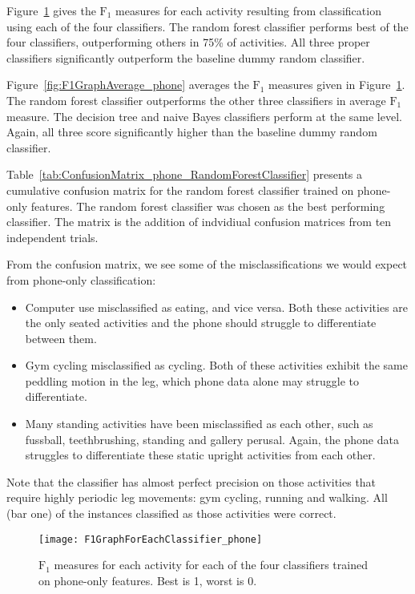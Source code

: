     Figure~\ref{fig:F1GraphForEachClassifier_phone} gives the $\mathrm{F}_1$ measures for each activity resulting from classification using each of the four classifiers. The random forest classifier performs best of the four classifiers, outperforming others in 75\% of activities. All three proper classifiers significantly outperform the baseline dummy random classifier.
    
    Figure~\ref{fig:F1GraphAverage_phone} averages the $\mathrm{F}_1$ measures given in Figure~\ref{fig:F1GraphForEachClassifier_phone}. The random forest classifier outperforms the other three classifiers in average $\mathrm{F}_1$ measure. The decision tree and naive Bayes classifiers perform at the same level. Again, all three score significantly higher than the baseline dummy random classifier.
    
    Table~\ref{tab:ConfusionMatrix_phone_RandomForestClassifier} presents a cumulative confusion matrix for the random forest classifier trained on phone-only features. The random forest classifier was chosen as the best performing classifier. The matrix is the addition of indvidiual confusion matrices from ten independent trials.
    
    From the confusion matrix, we see some of the misclassifications we would expect from phone-only classification:
    \begin{itemize}
      \item Computer use misclassified as eating, and vice versa. Both these activities are the only seated activities and the phone should struggle to differentiate between them.
      \item Gym cycling misclassified as cycling. Both of these activities exhibit the same peddling motion in the leg, which phone data alone may struggle to differentiate.
      \item Many standing activities have been misclassified as each other, such as fussball, teethbrushing, standing and gallery perusal. Again, the phone data struggles to differentiate these static upright activities from each other.
    \end{itemize}  
    Note that the classifier has almost perfect precision on those activities that require highly periodic leg movements: gym cycling, running and walking. All (bar one) of the instances classified as those activities were correct.



    \begin{figure}
      \centering
      \texttt{[image: F1GraphForEachClassifier\_phone]}
      \caption[$\mathrm{F}_1$ measures for each activity for each of the four classifiers trained on phone-only features.]{$\mathrm{F}_1$ measures for each activity for each of the four classifiers trained on phone-only features. Best is 1, worst is 0.}
      \label{fig:F1GraphForEachClassifier_phone}
    \end{figure}

